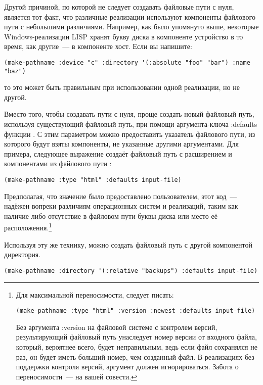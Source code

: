 Другой причиной, по которой не следует создавать файловые пути с нуля, является тот факт,
что различные реализации используют компоненты файлового пути с небольшими
различиями. Например, как было упомянуто выше, некоторые Windows-реализации LISP хранят
букву диска в компоненте устройство в то время, как другие~--- в компоненте хост. Если вы
напишите:

\begin{lstlisting}
(make-pathname :device "c" :directory '(:absolute "foo" "bar") :name "baz") 
\end{lstlisting}

то это может быть правильным при использовании одной реализации, но не другой.

Вместо того, чтобы создавать пути с нуля, проще создать новый файловый путь, используя
существующий файловый путь, при помощи аргумента-ключа :defaults функции
. С этим параметром можно предоставить указатель файлового пути, из
которого будут взяты компоненты, не указанные другими аргументами. Для примера, следующее
выражение создаёт файловый путь с расширением  и компонентами из файлового
пути :

\begin{lstlisting}
(make-pathname :type "html" :defaults input-file) 
\end{lstlisting}

Предполагая, что значение  было предоставлено пользователем, этот код~---
надёжен вопреки различиям операционных систем и реализаций, таким как наличие либо
отсутствие в файловом пути буквы диска или место её расположения.\footnote{Для
  максимальной переносимости, следует писать:

\begin{lstlisting}
(make-pathname :type "html" :version :newest :defaults input-file) 
\end{lstlisting}

Без аргумента :version на файловой системе с контролем версий, результирующий файловый
путь унаследует номер версии от входного файла, который, вероятнее всего, будет
неправильным, ведь если файл сохранялся не раз, он будет иметь больший номер, чем
созданный  файл. В реализациях без поддержки контроля версий, аргумент
 должен игнорироваться. Забота о переносимости~--- на вашей совести.}

Используя эту же технику, можно создать файловый путь с другой компонентой директория.

\begin{lstlisting}
(make-pathname :directory '(:relative "backups") :defaults input-file) 
\end{lstlisting}

